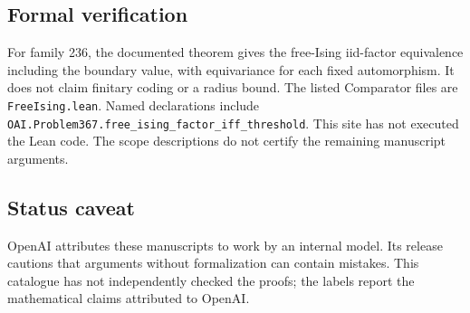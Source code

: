 \documentclass[11pt]{article}
\begin{document}
\subsection{Formal verification}
For family 236, the documented theorem gives the free-Ising iid-factor equivalence including the boundary value, with equivariance for each fixed automorphism. It does not claim finitary coding or a radius bound. The listed Comparator files are \texttt{FreeIsing.lean}. Named declarations include \texttt{OAI.Problem367.free\_ising\_factor\_iff\_threshold}. This site has not executed the Lean code. The scope descriptions do not certify the remaining manuscript arguments.

\subsection{Status caveat}
OpenAI attributes these manuscripts to work by an internal model. Its release cautions that arguments without formalization can contain mistakes. This catalogue has not independently checked the proofs; the labels report the mathematical claims attributed to OpenAI.
\end{document}
